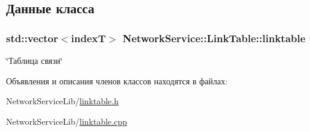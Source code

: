 \subsection{Данные класса}
\hypertarget{class_network_service_1_1_link_table_ac5650261ad60d19bb35235b2c4c9a284}{}
\subsubsection[{linktable}]{\setlength{\rightskip}{0pt plus 5cm}std\+::vector$<${\bf index\+T}$>$ Network\+Service\+::\+Link\+Table\+::linktable\hspace{0.3cm}{\ttfamily [private]}}\label{class_network_service_1_1_link_table_ac5650261ad60d19bb35235b2c4c9a284}


\char`\"{}Таблица связи\char`\"{} 



Объявления и описания членов классов находятся в файлах\+:\begin{DoxyCompactItemize}
\item 
Network\+Service\+Lib/\hyperlink{linktable_8h}{linktable.\+h}\item 
Network\+Service\+Lib/\hyperlink{linktable_8cpp}{linktable.\+cpp}\end{DoxyCompactItemize}
